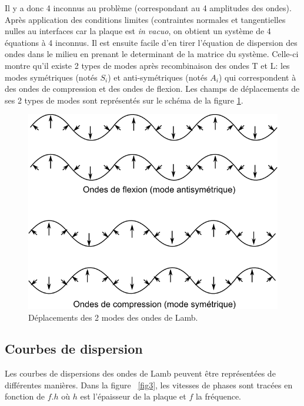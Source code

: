 \documentclass[twoside]{article}
\begin{document}
\begin{multicols}{2}
Il y a donc 4 inconnus au problème (correspondant au 4 amplitudes des ondes). Après application des conditions limites (contraintes normales et tangentielles nulles au interfaces car la plaque est \emph{in vacuo}, on obtient un système de 4 équations à 4 inconnus. Il est ensuite facile d'en tirer l'équation de dispersion des ondes dans le milieu en prenant le determinant de la matrice du système. Celle-ci montre qu'il existe 2 types de modes après recombinaison des ondes T et L: les modes symétriques (notés $S_i$) et anti-symétriques (notés $A_i$) qui correspondent à des ondes de compression et des ondes de flexion. Les champs de déplacements de ses 2 types de modes sont représentés sur le schéma de la figure \ref{fig2}.

\begin{figure}[H]
\centering
\includegraphics[scale=0.4]{./images/modes.png}
\caption{\label{fig2} Déplacements des 2 modes des ondes de Lamb.}
\end{figure}


\subsection{Courbes de dispersion}

Les courbes de dispersions des ondes de Lamb peuvent être représentées de différentes manières. Dans la figure ~\ref{fig3}, les vitesses de phases sont tracées en fonction de $f.h$ où $h$ est l'épaisseur de la plaque et $f$ la fréquence. 


\end{multicols}
\end{document}
